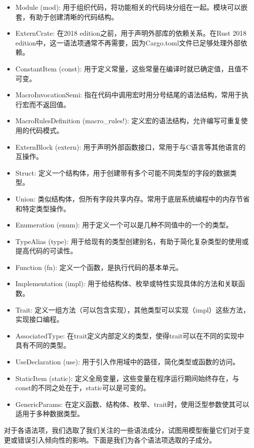 \begin{itemize}
    \item Module (mod): 用于组织代码，将功能相关的代码块分组在一起。模块可以嵌套，有助于创建清晰的代码结构。
    \item ExternCrate: 在2018 edition之前，用于声明外部库的依赖关系。在Rust 2018 edition中，这一语法项通常不再需要，因为Cargo.toml文件已足够处理外部依赖。
    \item ConstantItem (const): 用于定义常量，这些常量在编译时就已确定值，且值不可变。
    \item MacroInvocationSemi: 指在代码中调用宏时用分号结尾的语法结构，常用于执行宏而不返回值。
    \item MacroRulesDefinition (macro\_rules!): 定义宏的语法结构，允许编写可重复使用的代码模式。
    \item ExternBlock (extern): 用于声明外部函数接口，常用于与C语言等其他语言的互操作。
    \item Struct: 定义一个结构体，用于创建带有多个可能不同类型的字段的数据类型。
    \item Union: 类似结构体，但所有字段共享内存。常用于底层系统编程中的内存节省和特定类型操作。
    \item Enumeration (enum): 用于定义一个可以是几种不同值中的一个的类型。
    \item TypeAlias (type): 用于给现有的类型创建别名，有助于简化复杂类型的使用或提高代码的可读性。
    \item Function (fn): 定义一个函数，是执行代码的基本单元。
    \item Implementation (impl): 用于给结构体、枚举或特性实现具体的方法和关联函数。
    \item Trait: 定义一组方法（可以包含实现），其他类型可以实现（impl）这些方法，实现接口编程。
    \item AssociatedType: 在trait定义内部定义的类型，使得trait可以在不同的实现中具有不同的类型。
    \item UseDeclaration (use): 用于引入作用域中的路径，简化类型或函数的访问。
    \item StaticItem (static): 定义全局变量，这些变量在程序运行期间始终存在，与const的不同之处在于，static可以是可变的。
    \item GenericParams: 在定义函数、结构体、枚举、trait时，使用泛型参数使其可以适用于多种数据类型。
\end{itemize}
对于各语法项，我们选取了我们关注的一些语法成分，试图用模型衡量它们对于变更或错误引入倾向性的影响。下面是我们为各个语法项选取的子成分。

